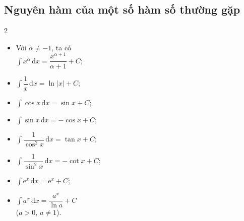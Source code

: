 \documentclass[12pt,aspectratio=169]{beamer}
\begin{document}
\subsection{Nguyên hàm của một số hàm số thường gặp}

\begin{tomtat}
	\begin{dl}
		\begin{multicols}{2}
			\begin{itemize}
				\item Với $\alpha\ne -1$, ta có \\
				$\displaystyle\int x^{\alpha}\mathrm{\,d}x=\dfrac{x^{\alpha+1}}{\alpha+1}+C$;
				\item $\displaystyle \int\dfrac{1}{x}\mathrm{\,d}x=\ln|x|+C$;
				\item $\displaystyle \int\cos x\mathrm{\,d}x=\sin x+C$;
				\item $\displaystyle \int \sin x\mathrm{\,d}x=-\cos x+C$;
				\item $\displaystyle \int \dfrac{1}{\cos^2x}\mathrm{\,d}x=\tan x+C$;
				\item $\displaystyle \int \dfrac{1}{\sin^2x}\mathrm{\,d}x=-\cot x+C$;
				\item $\displaystyle\int\mathrm{e}^x\mathrm{\,d}x=\mathrm{e}^x+C$;
				\item $\displaystyle\int a^x\mathrm{\,d}x=\dfrac{a^x}{\ln a}+C$\\ ($a>0$, $a\ne 1$).
			\end{itemize}
		\end{multicols}
	\end{dl}
\end{tomtat}
\end{document}
